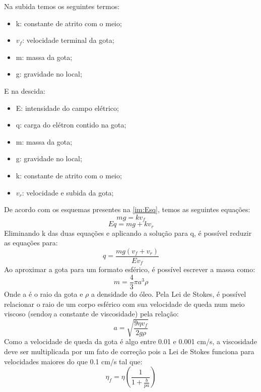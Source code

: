 	Na subida temos os seguintes termos:
\begin{itemize}
\item k: constante de atrito com o meio;
\item $v_{f}$: velocidade terminal da gota;
\item m: massa da gota;
\item g: gravidade no local;
\end{itemize}
E na descida:
\begin{itemize}
\item E: intensidade do campo elétrico;
\item q: carga do elétron contido na gota;
\item m: massa da gota;
\item g: gravidade no local;
\item k: constante de atrito com o meio;
\item $v_{r}$: velocidade e subida da gota;
\end{itemize}
De acordo com os esquemas presentes na \ref{im:Esq}, temos as seguintes equações:
\begin{equation}
mg = kv_{f}
\end{equation}
\begin{equation}
Eq = mg + kv_{r}
\end{equation}
Eliminando k das duas equações e aplicando a solução para q, é possível reduzir as equações para:
\begin{equation}
q =  \frac{mg(v_{f}+v_{r})}{Ev_{f}}
\label{eq:3}
\end{equation}
Ao aproximar a gota para um formato esférico, é possível escrever a massa como:
\begin{equation}
m =  \frac{4}{3} \pi  a^{3}  \rho
\label{eq:4}
\end{equation}	           
Onde a é o raio da gota e $\rho$ a densidade do óleo. Pela Lei de Stokes, é possível relacionar o raio de um corpo esférico com sua velocidade de queda num meio viscoso (sendo$\eta$ a constante de viscosidade) pela relação:
\begin{equation}
a =  \sqrt{ \frac{9 \eta v_{f}}{2g \rho} }
\label{eq:5}
\end{equation}
Como a velocidade de queda da gota é algo entre 0.01 e 0.001 cm/s, a viscosidade deve ser multiplicada por um fato de correção pois a Lei de Stokes funciona para velocidades maiores do que 0.1 cm/s tal que:
\begin{equation}
\eta_{f} = \eta \left( \frac{1}{1+ \frac{b}{pa} } \right)
\label{eq:6}
\end{equation}
